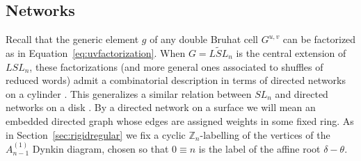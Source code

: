 \documentclass[12pt]{amsart}
\newcommand{\ZZ}{\mathbb{Z}}
\theoremstyle{remark}
\numberwithin{equation}{section}
\numberwithin{figure}{section}
\begin{document}
\subsection{Networks}
\label{sec:networks}
Recall that the generic element $g$ of any double Bruhat cell $G^{u,v}$ can be factorized as in Equation~\eqref{eq:uvfactorization}.
When $G = \widetilde{LSL}_n$ is the central extension of $LSL_n$, these factorizations (and more general ones associated to shuffles of reduced words) admit a combinatorial description in terms of directed networks on a cylinder \cite{GSV12,FM14}.
This generalizes a similar relation between $SL_n$ and directed networks on a disk \cite{FZ99}.
By a directed network on a surface we will mean an embedded directed graph whose edges are assigned weights in some fixed ring.
As in Section~\ref{sec:rigidregular} we fix a cyclic $\ZZ_n$-labelling of the vertices of the $A_{n-1}^{\!(1)}$ Dynkin diagram, chosen so that $0 \equiv n$ is the label of the affine root $\delta - \theta$.
\end{document}

